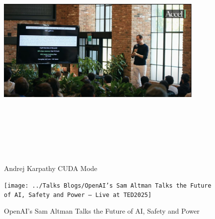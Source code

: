 \documentclass[a4paper,12pt]{article}
\begin{document}
\newpage
\vspace*{1cm} %
\begin{figure}[h]
	\centering
	\vspace{-10pt} %
	\includegraphics[width=0.9\textwidth, height=12cm, keepaspectratio]{../Talks Blogs/Andrej Karpathy CUDA Mode}
	\vspace{-5pt} %
	\caption{Andrej Karpathy CUDA Mode}
	\vspace{-10pt}
\end{figure}


\vspace{40pt} %
\begin{figure}[h]
	\centering
	\vspace{-10pt} %
	\texttt{[image: ../Talks Blogs/OpenAI's Sam Altman Talks the Future of AI, Safety and Power — Live at TED2025]}
	\vspace{-5pt} %
	\caption{OpenAI's Sam Altman Talks the Future of AI, Safety and Power}
	\vspace{-10pt}
\end{figure}
\end{document}
